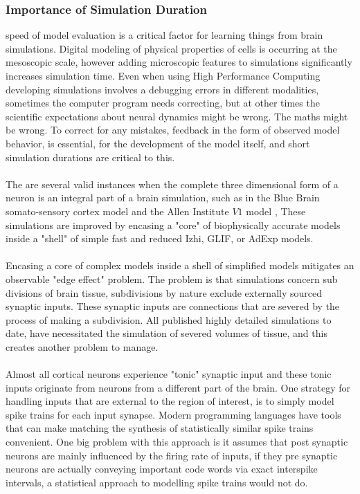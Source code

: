 \subsubsection{Importance of Simulation Duration}
speed of model evaluation is a critical factor for learning things from brain simulations. Digital modeling of physical properties of cells is occurring at the mesoscopic scale, however adding microscopic features to simulations significantly increases simulation time. Even when using High Performance Computing developing simulations involves a debugging errors in different modalities, sometimes the computer program needs correcting, but at other times the scientific expectations about neural dynamics might be wrong. The maths might be wrong. To correct for any mistakes, feedback in the form of observed model behavior, is essential, for the development of the model itself, and short simulation durations are critical to this.\\
\\
The are several valid instances when the complete three dimensional form of a neuron is an integral part of a brain simulation, such as in the Blue Brain somato-sensory cortex model \cite{} and the Allen Institute $V1$ model \cite{}, These simulations are improved by encasing a "core" of biophysically accurate models inside a "shell" of simple fast and reduced Izhi, GLIF, or AdExp models.\\ 
\\
Encasing a core of complex models inside a shell of simplified models mitigates an observable "edge effect" problem. The problem is that simulations concern sub divisions of brain tissue, subdivisions by nature exclude externally sourced synaptic inputs. These synaptic inputs are connections that are severed by the process of making a subdivision. All published highly detailed simulations to date, have necessitated the simulation of severed volumes of tissue, and this creates another problem to manage.\\
\\
Almost all cortical neurons experience "tonic" synaptic input and these tonic inputs originate from neurons from a different part of the brain. One strategy for handling inputs that are external to the region of interest, is to simply model spike trains for each input synapse. Modern programming languages have tools that can make matching the synthesis of statistically similar spike trains convenient. One big problem with this approach is it assumes that post synaptic neurons are mainly influenced by the firing rate of inputs, if they pre synaptic neurons are actually conveying important code words via exact interspike intervals, a statistical approach to modelling spike trains would not do.

